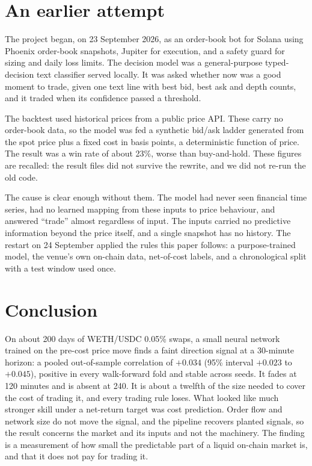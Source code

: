 \documentclass[11pt,a4paper]{article}
\begin{document}
\section{An earlier attempt}
\label{sec:prior}

The project began, on 23 September 2026, as an order-book bot for Solana
using Phoenix order-book snapshots, Jupiter for execution, and a safety guard
for sizing and daily loss limits. The decision model was a general-purpose
typed-decision text classifier served locally. It was asked whether now was
a good moment to trade, given one text line with best bid, best ask and depth
counts, and it traded when its confidence passed a threshold.

The backtest used historical prices from a public price API. These carry no
order-book data, so the model was fed a synthetic bid/ask ladder generated
from the spot price plus a fixed cost in basis points, a deterministic
function of price. The result was a win rate of about 23\%, worse than
buy-and-hold. These figures are recalled: the result files did not survive the
rewrite, and we did not re-run the old code.

The cause is clear enough without them. The model had never seen financial
time series, had no learned mapping from these inputs to price behaviour, and
answered ``trade'' almost regardless of input. The inputs carried no
predictive information beyond the price itself, and a single snapshot has no
history. The restart on 24 September applied the rules this paper follows: a
purpose-trained model, the venue's own on-chain data, net-of-cost labels, and
a chronological split with a test window used once.

\section{Conclusion}

On about 200 days of WETH/USDC 0.05\% swaps, a small neural network trained on
the pre-cost price move finds a faint direction signal at a 30-minute horizon:
a pooled out-of-sample correlation of $+0.034$ (95\% interval $+0.023$ to
$+0.045$), positive in every walk-forward fold and stable across seeds. It fades
at 120 minutes and is absent at 240. It is about a twelfth of the size needed
to cover the cost of trading it, and every trading rule loses. What looked like
much stronger skill under a net-return target was cost prediction. Order flow
and network size do not move the signal, and the pipeline recovers planted
signals, so the result concerns the market and its inputs and not the machinery.
The finding is a measurement of how small the predictable part of a liquid
on-chain market is, and that it does not pay for trading it.
\end{document}
